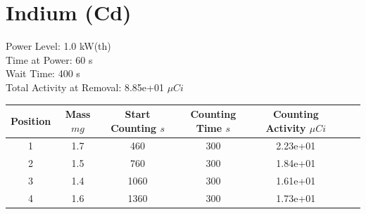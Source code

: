 \newpage

\section*{ Indium  (Cd) }

Power Level: 1.0 kW(th) \\
Time at Power: 60 s \\
Wait Time: 400 s \\
Total Activity at Removal: 8.85e+01 $\mu Ci$

\begin{table}[h]
\centering
\begin{tabular}{ |c|c|c|c|c|c|c| }
 \hline
 Position & Mass $mg$ & Start Counting $s$ & Counting Time $s$ & Counting Activity $\mu Ci$ \\
 \hline 
 1 & 1.7 & 460 & 300 & 2.23e+01\\ 
\hline
 2 & 1.5 & 760 & 300 & 1.84e+01\\ 
\hline
 3 & 1.4 & 1060 & 300 & 1.61e+01\\ 
\hline
 4 & 1.6 & 1360 & 300 & 1.73e+01\\ 
\hline
\end{tabular}
\end{table}

\begin{figure}[!ht]
   \centering
   \quad
   \\ 
   \quad 

\end{figure}

